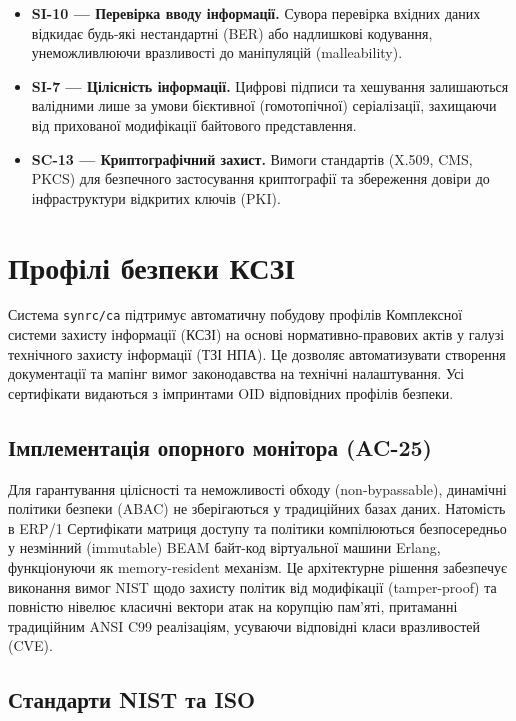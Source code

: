 \begin{itemize}
    \item \textbf{SI-10 — Перевірка вводу інформації.}
          Сувора перевірка вхідних даних відкидає будь-які нестандартні (BER) або надлишкові
          кодування, унеможливлюючи вразливості до маніпуляцій (malleability).

    \item \textbf{SI-7 — Цілісність інформації.}
          Цифрові підписи та хешування залишаються валідними лише за умови бієктивної
          (гомотопічної) серіалізації, захищаючи від прихованої модифікації байтового представлення.

    \item \textbf{SC-13 — Криптографічний захист.}
          Вимоги стандартів (X.509, CMS, PKCS) для безпечного застосування криптографії та
          збереження довіри до інфраструктури відкритих ключів (PKI).
\end{itemize}

\section{Профілі безпеки КСЗІ}

Система \texttt{synrc/ca} підтримує автоматичну побудову профілів Комплексної системи захисту
інформації (КСЗІ) на основі нормативно-правових актів у галузі технічного захисту інформації
(ТЗІ НПА). Це дозволяє автоматизувати створення документації та мапінг вимог законодавства на
технічні налаштування. Усі сертифікати видаються з імпринтами OID відповідних профілів безпеки.

\subsection{Імплементація опорного монітора (AC-25)}

Для гарантування цілісності та неможливості обходу (non-bypassable), динамічні політики безпеки
(ABAC) не зберігаються у традиційних базах даних. Натомість в ERP/1 Сертифікати матриця доступу
та політики компілюються безпосередньо у незмінний (immutable) BEAM байт-код віртуальної машини
Erlang, функціонуючи як memory-resident механізм. Це архітектурне рішення забезпечує виконання
вимог NIST щодо захисту політик від модифікації (tamper-proof) та повністю нівелює класичні
вектори атак на корупцію пам'яті, притаманні традиційним ANSI C99 реалізаціям, усуваючи
відповідні класи вразливостей (CVE).

\subsection{Стандарти NIST та ISO}

